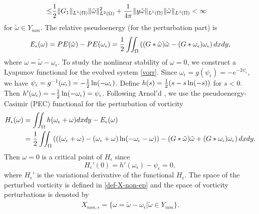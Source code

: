 \documentclass[1 [leqno, 11pt]{amsart}
\numberwithin{equation}{section}
\let\ep=\epsilon
\begin{document}
\begin{CJK*}{GBK}{song}
\begin{align}
\leq&{1\over2}\|G_1\|_{L^1(\Omega)}\|\tilde \omega\|_{L^2(\Omega)}^2+{1\over 4\pi}\|y\tilde\omega\|_{L^1(\Omega)}\|\tilde\omega\|_{L^1(\Omega)}<\infty
\end{align}
for $\tilde\omega\in Y_{non}$.
The relative  pseudoenergy (for the perturbation part) is
\begin{align*}
E_\ep(\omega)=PE(\tilde \omega)-PE(\omega_{\ep})={1\over2}\iint_{\Omega}\left((G\ast\tilde \omega)\tilde \omega -(G\ast\omega_{\ep}) \omega_{\ep}\right) dxdy,
\end{align*}
where $\omega=\tilde \omega-\omega_{\ep}$.
To study the nonlinear stability of $\omega=0$,  we construct a Lyapunov functional for the evolved system \eqref{vorr}. Since  $\omega_\epsilon = g(\psi_\epsilon) = - e^{-2\psi_\epsilon}$, we have $\psi_\epsilon=g^{-1}(\omega_\epsilon)=-{1\over 2}\ln(-\omega_\ep)$.
Define $h(s)={1\over2}(s-s\ln(-s))$ for $s<0$. Then $h'(\omega_\ep)=-{1\over2}\ln(-\omega_\ep)=\psi_\ep$.
Following  Arnol$'$d \cite{Arnold65,Arnold69}, we use the pseudoenergy-Casimir (PEC) functional for the perturbation of vorticity
\begin{align}\nonumber H_\ep(\omega)&= \iint_{\Omega}h(\omega_\ep + \omega )dxdy - E_\ep(\omega)\\\nonumber
&={1\over2}\iint_{\Omega}\left(((\omega_\ep + \omega)-(\omega_\ep + \omega)\ln(-\omega_\ep - \omega))-(G\ast\tilde \omega)\tilde \omega +(G\ast\omega_{\ep}) \omega_{\ep}\right)dxdy.
\end{align}
Then $\omega=0$ is a critical point of $H_\ep$ since
$$H_\ep'(0)= h'(\omega_\epsilon)  - \psi_\epsilon = 0,$$
where $H_\ep'$ is the  variational derivative of the functional $H_\ep$.
The space of the perturbed vorticity is defined  in \eqref{def-X-non-ep}
and the space of vorticity perturbations is denoted by
\begin{align*}
X_{non,\ep}=\{\omega=\tilde \omega-\omega_\ep|\tilde \omega\in Y_{non}\}.

\end{align*}
\end{CJK*}
\end{document}
